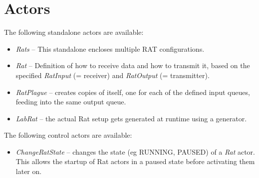 \documentclass[a4paper]{book}
\begin{document}
\section{Actors}
The following standalone actors are available:
\begin{itemize}
	\item \textit{Rats} -- This standalone encloses multiple RAT configurations.
	\item \textit{Rat} -- Definition of how to receive data and how to transmit 
	it, based on the specified \textit{RatInput} (= receiver) and 
	\textit{RatOutput} (= transmitter).
	\item \textit{RatPlague} -- creates copies of itself, one for each of
	the defined input queues, feeding into the same output queue.
	\item \textit{LabRat} -- the actual Rat setup gets generated at runtime
	using a generator.
\end{itemize}
The following control actors are available:
\begin{itemize}
	\item \textit{ChangeRatState} -- changes the state (eg RUNNING, PAUSED)
	of a \textit{Rat} actor. This allows the startup of Rat actors in a
	paused state before activating them later on.
\end{itemize}


\end{document}
